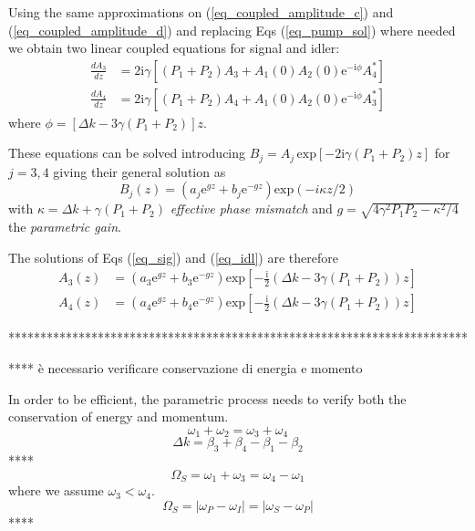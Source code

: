 \documentclass[12pt,a4paper,twoside]{article}
\begin{document}
Using the same approximations on (\ref{eq_coupled_amplitude_c}) and (\ref{eq_coupled_amplitude_d}) and replacing Eqs (\ref{eq_pump_sol}) where needed we obtain two linear coupled equations for signal and idler:
\begin{subequations}
\begin{align}
	\frac{dA_3}{dz} &= 2\mathrm{i}\gamma [(P_1 + P_2)A_3 + A_1(0)A_2(0)\mathrm{e}^{-\mathrm{i}\phi}A_4^*]
	\label{eq_sig}\\
	\frac{dA_4}{dz} &= 2\mathrm{i}\gamma [(P_1 + P_2)A_4 + A_1(0)A_2(0)\mathrm{e}^{-\mathrm{i}\phi}A_3^*]
	\label{eq_idl}
\end{align}
\end{subequations}
where $\phi = [\Delta k - 3\gamma(P_1 + P_2)]z$.

These equations can be solved introducing $B_j = A_j \,\mathrm{exp}[-2\mathrm{i}\gamma(P_1+P_2)z]$ for $j=3,4$ giving their general solution as
\begin{equation*}
	B_j(z) = (a_j\mathrm{e}^{gz}+b_j\mathrm{e}^{-gz})\mathrm{exp}(-i\kappa z/2)
\end{equation*}
with $\kappa = \Delta k + \gamma(P_1 + P_2)$ \textit{effective phase mismatch} and $g = \sqrt{4\gamma^2P_1P_2 - \kappa^2/4}$ the \textit{parametric gain}.

The solutions of Eqs (\ref{eq_sig}) and (\ref{eq_idl}) are therefore
\begin{subequations}
\begin{align}
	A_3(z) &= \left(a_3\mathrm{e}^{gz}+b_3\mathrm{e}^{-gz}\right)\mathrm{exp}\left[-\frac{\mathrm{i}}{2}(\Delta k -3\gamma(P_1 + P_2))z\right]
		\label{eq_sig_sol} \\
	A_4(z) &= \left(a_4\mathrm{e}^{gz}+b_4\mathrm{e}^{-gz}\right)\mathrm{exp}\left[-\frac{\mathrm{i}}{2}(\Delta k -3\gamma(P_1 + P_2))z\right]	
		\label{eq_idl_sol}
\end{align}
\end{subequations}

\vspace{18pt}
************************************************************************
\vspace{12pt}

****		è necessario verificare conservazione di energia e momento
\vspace{12pt}

In order to be efficient, the parametric process needs to verify both the conservation of energy and momentum.
$$\omega_1 + \omega_2 = \omega_3 + \omega_4$$
$$\Delta k = \beta_3 + \beta_4 - \beta_1 - \beta_2$$
****
$$\Omega_S = \omega_1 + \omega_3 = \omega_4 - \omega_1$$
where we assume $\omega_3 < \omega_4$.
$$\Omega_S = |\omega_P - \omega_I| = |\omega_S - \omega_P|$$
****
\end{document}
